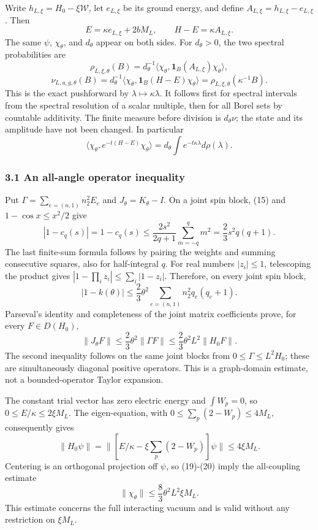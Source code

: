 \documentclass[
  11pt,
]{article}
\begin{document}
Write \(h_{L,\xi}=H_0-\xi\mathcal W\), let \(e_{L,\xi}\) be its ground
energy, and define \(A_{L,\xi}=h_{L,\xi}-e_{L,\xi}\). Then \[
 E=\kappa e_{L,\xi}+2bM_L,\qquad H-E=\kappa A_{L,\xi}.
\tag{16}
\] The same \(\psi\), \(\chi_\theta\), and \(d_\theta\) appear on both
sides. For \(d_\theta>0\), the two spectral probabilities are \[
 \rho_{L,\xi,\theta}(B)=d_\theta^{-1}
 \langle\chi_\theta,\mathbf1_B(A_{L,\xi})\chi_\theta\rangle,
\] \[
 \nu_{L,a,g,\theta}(B)=d_\theta^{-1}
 \langle\chi_\theta,\mathbf1_B(H-E)\chi_\theta\rangle
 =\rho_{L,\xi,\theta}(\kappa^{-1}B).
\tag{17}
\] This is the exact pushforward by \(\lambda\mapsto\kappa\lambda\). It
follows first for spectral intervals from the spectral resolution of a
scalar multiple, then for all Borel sets by countable additivity. The
finite measure before division is \(d_\theta\nu\); the state and its
amplitude have not been changed. In particular \[
 \langle\chi_\theta,e^{-t(H-E)}\chi_\theta\rangle
 =d_\theta\int e^{-t\kappa\lambda}d\rho(\lambda).
\tag{18}
\]

\subsubsection{3.1 An all-angle operator
inequality}\label{an-all-angle-operator-inequality}

Put \(\Gamma=\sum_{e=(n,1)}n_2^2E_e\) and \(J_\theta=K_\theta-I\). On a
joint spin block, (15) and \(1-\cos x\le x^2/2\) give \[
 |1-c_q(s)|=1-c_q(s)
 \le\frac{2s^2}{2q+1}\sum_{m=-q}^qm^2
 =\frac23s^2q(q+1).
\] The last finite-sum formula follows by pairing the weights and
summing consecutive squares, also for half-integral \(q\). For real
numbers \(|z_i|\le1\), telescoping the product gives
\(|1-\prod_i z_i|\le\sum_i|1-z_i|\). Therefore, on every joint spin
block, \[
 |1-k(\theta)|\le\frac23\theta^2\sum_{e=(n,1)}n_2^2q_e(q_e+1).
\] Parseval's identity and completeness of the joint matrix coefficients
prove, for every \(F\in D(H_0)\), \[
 \|J_\theta F\|\le\frac23\theta^2\|\Gamma F\|
 \le\frac23\theta^2L^2\|H_0F\|.
\tag{19}
\] The second inequality follows on the same joint blocks from
\(0\le\Gamma\le L^2H_0\); these are simultaneously diagonal positive
operators. This is a graph-domain estimate, not a bounded-operator
Taylor expansion.

The constant trial vector has zero electric energy and \(\int W_p=0\),
so \(0\le E/\kappa\le2\xi M_L\). The eigen-equation, with
\(0\le\sum_p(2-W_p)\le4M_L\), consequently gives \[
 \|H_0\psi\|
 =\|[E/\kappa-\xi\sum_p(2-W_p)]\psi\|
 \le4\xi M_L.
\tag{20}
\] Centering is an orthogonal projection off \(\psi\), so (19)-(20)
imply the all-coupling estimate \[
 \boxed{\quad\|\chi_\theta\|\le\frac83\theta^2L^2\xi M_L.\quad}
\tag{21}
\] This estimate concerns the full interacting vacuum and is valid
without any restriction on \(\xi M_L\).
\end{document}
